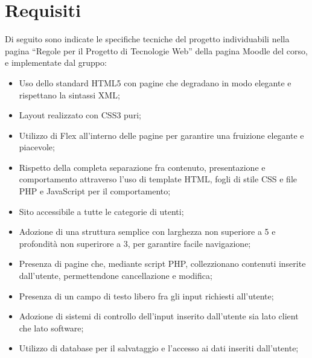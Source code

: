 \section{Requisiti}

Di seguito sono indicate le specifiche tecniche del progetto individuabili nella pagina ``Regole per il Progetto di Tecnologie Web'' della pagina Moodle del corso, e implementate dal gruppo:
\begin{itemize}
    \item Uso dello standard HTML5 con pagine che degradano in modo elegante e rispettano la sintassi XML;
    \item Layout realizzato con CSS3 puri;
    \item Utilizzo di Flex all'interno delle pagine per garantire una fruizione elegante e piacevole;
    \item Rispetto della completa separazione fra contenuto, presentazione e comportamento attraverso l'uso di template HTML, fogli di stile CSS e file PHP e JavaScript per il comportamento;
    \item Sito accessibile a tutte le categorie di utenti;
    \item Adozione di una struttura semplice con larghezza non superiore a 5 e profondità non superirore a 3, per garantire facile navigazione;
    \item Presenza di pagine che, mediante script PHP, collezzionano contenuti inserite dall'utente, permettendone cancellazione e modifica;
    \item Presenza di un campo di testo libero fra gli input richiesti all'utente;
    \item Adozione di sistemi di controllo dell'input inserito dall'utente sia lato client che lato software;
    \item Utilizzo di database per il salvataggio e l'accesso ai dati inseriti dall'utente;
\end{itemize}
